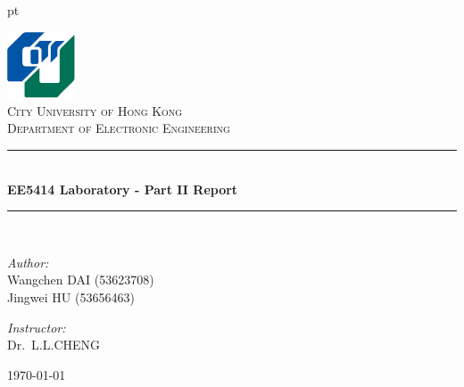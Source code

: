 \documentclass[13pt,journal,draftclsnofoot,onecolumn]{IEEEtran}
\begin{document}

 pt

\begin{titlepage}

\begin{center}


\includegraphics[width=0.15\textwidth]{./figs/logo.png}\\[1cm]    

\textsc{\LARGE City University of Hong Kong}\\[1.5cm]

\textsc{\Large Department  of Electronic Engineering}\\[0.5cm]


\rule{0.9\textwidth}{1pt}\\[0.4cm]
{ \huge \bfseries EE5414 Laboratory - Part II Report}\\[0.4cm]
\rule{0.9\textwidth}{1pt}\\[1.5cm]


\begin{minipage}[t]{0.4\textwidth}
\begin{flushleft} \large
\emph{Author:}\\
Wangchen \textsc{DAI} (53623708)\\
Jingwei \textsc{HU} (53656463)\\
\end{flushleft}
\end{minipage}
\begin{minipage}[t]{0.4\textwidth}
\begin{flushright} \large
\emph{Instructor:} \\
Dr.~L.L.\textsc{CHENG}  
\end{flushright}
\end{minipage}

\vfill

{\large \today}

\end{center}

\end{titlepage}

\clearpage
\end{document}
